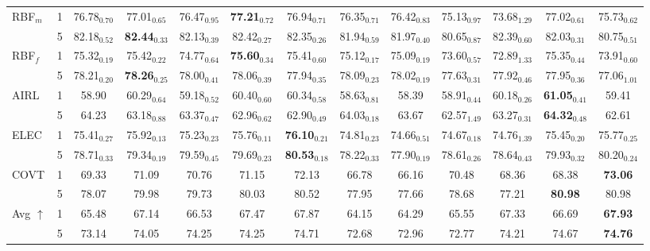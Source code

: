 \begin{table}[t]
\begin{tabular}{l|c|ccccc|cccc|cc}
\multirow{2}{*}{RBF$_m$}
& 1 & 76.78$_{0.70}$ & 77.01$_{0.65}$ & 76.47$_{0.95}$ & \textbf{77.21$_{0.72}$} & 76.94$_{0.71}$ & 76.35$_{0.71}$ & 76.42$_{0.83}$ & 75.13$_{0.97}$ & 73.68$_{1.29}$ & 77.02$_{0.61}$ & 75.73$_{0.62}$ \\
& 5 & 82.18$_{0.52}$ & \textbf{82.44$_{0.33}$} & 82.13$_{0.39}$ & 82.42$_{0.27}$ & 82.35$_{0.26}$ & 81.94$_{0.59}$ & 81.97$_{0.40}$ & 80.65$_{0.87}$ & 82.39$_{0.60}$ & 82.03$_{0.31}$ & 80.75$_{0.51}$ \\

\multirow{2}{*}{RBF$_f$}
& 1 & 75.32$_{0.19}$ & 75.42$_{0.22}$ & 74.77$_{0.64}$ & \textbf{75.60$_{0.34}$} & 75.41$_{0.60}$ & 75.12$_{0.17}$ & 75.09$_{0.19}$ & 73.60$_{0.57}$ & 72.89$_{1.33}$ & 75.35$_{0.44}$ & 73.91$_{0.60}$ \\
& 5 & 78.21$_{0.20}$ & \textbf{78.26$_{0.25}$} & 78.00$_{0.41}$ & 78.06$_{0.39}$ & 77.94$_{0.35}$ & 78.09$_{0.23}$ & 78.02$_{0.19}$ & 77.63$_{0.31}$ & 77.92$_{0.46}$ & 77.95$_{0.36}$ & 77.06$_{1.01}$ \\

\multirow{2}{*}{AIRL}
& 1 & 58.90 & 60.29$_{0.64}$ & 59.18$_{0.52}$ & 60.40$_{0.60}$ & 60.34$_{0.58}$ & 58.63$_{0.81}$ & 58.39 & 58.91$_{0.44}$ & 60.18$_{0.26}$ & \textbf{61.05$_{0.41}$} & 59.41 \\
& 5 & 64.23 & 63.18$_{0.88}$ & 63.37$_{0.47}$ & 62.96$_{0.62}$ & 62.90$_{0.49}$ & 64.03$_{0.18}$ & 63.67 & 62.57$_{1.49}$ & 63.27$_{0.31}$ & \textbf{64.32$_{0.48}$} & 62.61 \\

\multirow{2}{*}{ELEC}
& 1 & 75.41$_{0.27}$ & 75.92$_{0.13}$ & 75.23$_{0.23}$ & 75.76$_{0.11}$ & \textbf{76.10$_{0.21}$} & 74.81$_{0.23}$ & 74.66$_{0.51}$ & 74.67$_{0.18}$ & 74.76$_{1.39}$ & 75.45$_{0.20}$ & 75.77$_{0.25}$ \\
& 5 & 78.71$_{0.33}$ & 79.34$_{0.19}$ & 79.59$_{0.45}$ & 79.69$_{0.23}$ & \textbf{80.53$_{0.18}$} & 78.22$_{0.33}$ & 77.90$_{0.19}$ & 78.61$_{0.26}$ & 78.64$_{0.43}$ & 79.93$_{0.32}$ & 80.20$_{0.24}$ \\

\multirow{2}{*}{COVT}
& 1 & 69.33 & 71.09 & 70.76 & 71.15 & 72.13 & 66.78 & 66.16 & 70.48 & 68.36 & 68.38 & \textbf{73.06} \\
& 5 & 78.07 & 79.98 & 79.73 & 80.03 & 80.52 & 77.95 & 77.66 & 78.68 & 77.21 & \textbf{80.98} & 80.98 \\

\midrule

\multirow{2}{*}{Avg $\uparrow$}
& 1 & 65.48 & 67.14 & 66.53 & 67.47 & 67.87 & 64.15 & 64.29 & 65.55 & 67.33 & 66.69 & \textbf{67.93} \\
& 5 & 73.14 & 74.05 & 74.25 & 74.25 & 74.71 & 72.68 & 72.96 & 72.77 & 74.21 & 74.67 & \textbf{74.76} \\


\end{tabular}
\end{table}
